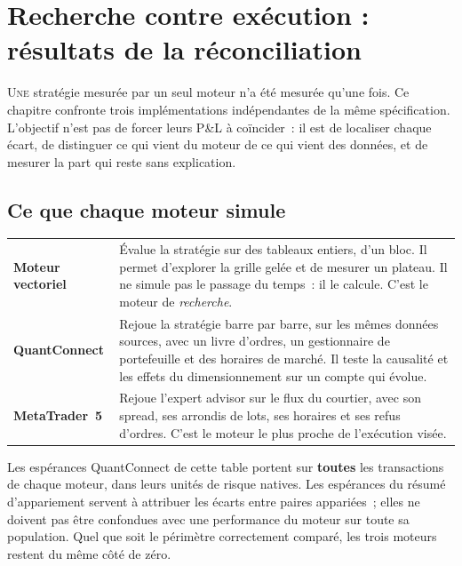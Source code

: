\section{Recherche contre exécution : résultats de la réconciliation}
\label{sec:x10_reconciliation}

\lettrine[lines=2, findent=2pt, nindent=0pt]{U}{ne} stratégie mesurée par un
seul moteur n'a été mesurée qu'une fois. Ce chapitre confronte trois
implémentations indépendantes de la même spécification. L'objectif n'est pas de
forcer leurs P\&L à coïncider~: il est de localiser chaque écart, de distinguer
ce qui vient du moteur de ce qui vient des données, et de mesurer la part qui
reste sans explication.

\subsection{Ce que chaque moteur simule}

\begin{center}
\renewcommand{\arraystretch}{1.35}
\begin{tabular}{p{3.0cm}p{11.0cm}}
\toprule
\textbf{Moteur vectoriel} & Évalue la stratégie sur des tableaux entiers,
d'un bloc. Il permet d'explorer la grille gelée et de mesurer un plateau. Il
ne simule pas le passage du temps~: il le calcule. C'est le moteur de
\emph{recherche}. \\
\textbf{QuantConnect} & Rejoue la stratégie barre par barre, sur les mêmes
données sources, avec un livre d'ordres, un gestionnaire de portefeuille et
des horaires de marché. Il teste la causalité et les effets du dimensionnement
sur un compte qui évolue. \\
\textbf{MetaTrader~5} & Rejoue l'expert advisor sur le flux du courtier, avec
son spread, ses arrondis de lots, ses horaires et ses refus d'ordres. C'est le
moteur le plus proche de l'exécution visée. \\
\bottomrule
\end{tabular}
\end{center}



Les espérances QuantConnect de cette table portent sur \textbf{toutes} les
transactions de chaque moteur, dans leurs unités de risque natives. Les
espérances du résumé d'appariement servent à attribuer les écarts entre
paires appariées~; elles ne doivent pas être confondues avec une performance
du moteur sur toute sa population. Quel que soit le périmètre correctement
comparé, les trois moteurs restent du même côté de zéro.

